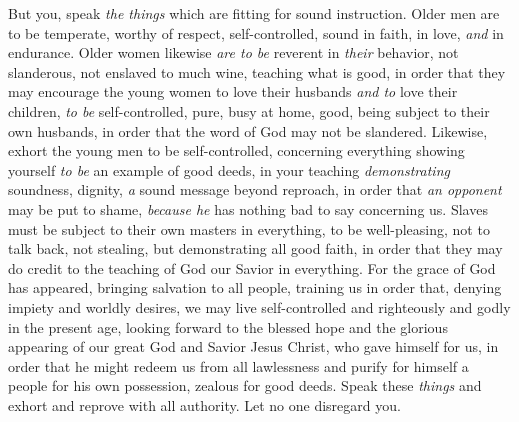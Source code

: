 \begin{biblechapter} %
 But you, speak \textit{the things} which are fitting for sound instruction.
\verse Older men are to be temperate, worthy of respect, self-controlled, sound in faith, in love, \textit{and} in endurance.
\verse Older women likewise \textit{are to be} reverent in \textit{their} behavior, not slanderous, not enslaved to much wine, teaching what is good,
\verse in order that they may encourage the young women to love their husbands \textit{and to} love their children,
\verse \textit{to be} self-controlled, pure, busy at home, good, being subject to their own husbands, in order that the word of God may not be slandered.
\verse Likewise, exhort the young men to be self-controlled,
\verse concerning everything showing yourself \textit{to be} an example of good deeds, in your teaching \textit{demonstrating} soundness, dignity,
\verse \textit{a} sound message beyond reproach, in order that \textit{an opponent} may be put to shame, \textit{because he} has nothing bad to say concerning us.
\verse Slaves must be subject to their own masters in everything, to be well-pleasing, not to talk back,
\verse not stealing, but demonstrating all good faith, in order that they may do credit to the teaching of God our Savior in everything.
\verse For the grace of God has appeared, bringing salvation to all people,
\verse training us in order that, denying impiety and worldly desires, we may live self-controlled and righteously and godly in the present age,
\verse looking forward to the blessed hope and the glorious appearing of our great God and Savior Jesus Christ,
\verse who gave himself for us, in order that he might redeem us from all lawlessness and purify for himself a people for his own possession, zealous for good deeds.
\verse Speak these \textit{things} and exhort and reprove with all authority. Let no one disregard you.
\end{biblechapter}


